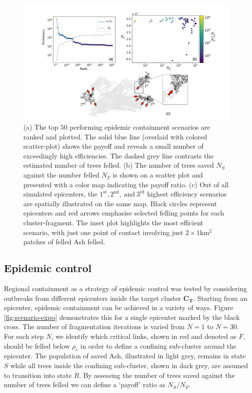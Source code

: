 \begin{figure}
    \centering
    \includegraphics[scale=0.325]{chapter5/figures/figure7.pdf}
    \caption{(a) The top $50$ performing epidemic containment scenarios are ranked and plotted. The solid blue line (overlaid with colored scatter-plot) shows the payoff and reveals a small number of exceedingly high efficiencies. The dashed grey line contrasts the estimated number of trees felled. (b) The number of trees saved $N_S$ against the number felled $N_F$ is shown on a scatter plot and presented with a color map indicating the payoff ratio. (c) Out of all simulated epicenters, the $\mathrm{1^{st}, 2^{nd},\ and\ 3^{rd}}$ highest efficiency scenarios are spatially illustrated on the same map. Black circles represent epicenters and red arrows emphasise selected felling points for each cluster-fragment. The inset plot highlights the most efficient scenario, with just one point of contact involving just $2\times 1 \mathrm{km^2}$ patches of felled Ash felled.}
    \label{fig:result-culling-efficiency}
\end{figure}{}


\subsection{Epidemic control}
Regional containment as a strategy of epidemic control was tested by considering outbreaks from different epicenters inside the target cluster $\mathbf{C_T}$. Starting from an epicenter, epidemic containment can be achieved in a variety of ways. Figure \ref{fig:scenario-expo} demonstrates this for a single epicenter marked by the black cross. The number of fragmentation iterations is varied from $N=1$ to $N=30$. For each step $N$, we identify which critical links, shown in red and denoted as $F$, should be felled below $\rho_c$ in order to define a confining sub-cluster around the epicenter. The population of saved Ash, illustrated in light grey, remains in state $S$ while all trees inside the confining sub-cluster, shown in dark grey, are assumed to transition into state $R$. By assessing the number of trees saved against the number of trees felled we can define a `payoff' ratio as $N_S/N_F$.\\

